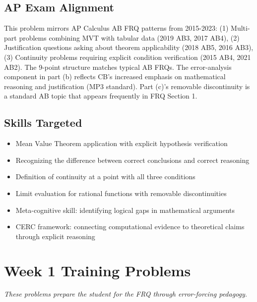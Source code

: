 \documentclass[11pt,letterpaper]{article}
\begin{document}
\subsection*{AP Exam Alignment}
This problem mirrors AP Calculus AB FRQ patterns from 2015-2023: (1) Multi-part problems combining MVT with tabular data (2019 AB3, 2017 AB4), (2) Justification questions asking about theorem applicability (2018 AB5, 2016 AB3), (3) Continuity problems requiring explicit condition verification (2015 AB4, 2021 AB2). The 9-point structure matches typical AB FRQs. The error-analysis component in part (b) reflects CB's increased emphasis on mathematical reasoning and justification (MP3 standard). Part (c)'s removable discontinuity is a standard AB topic that appears frequently in FRQ Section 1.

\subsection*{Skills Targeted}
\begin{itemize}[leftmargin=*]
  \item Mean Value Theorem application with explicit hypothesis verification
  \item Recognizing the difference between correct conclusions and correct reasoning
  \item Definition of continuity at a point with all three conditions
  \item Limit evaluation for rational functions with removable discontinuities
  \item Meta-cognitive skill: identifying logical gaps in mathematical arguments
  \item CERC framework: connecting computational evidence to theoretical claims through explicit reasoning
\end{itemize}

\vspace{0.5cm}


\section*{\textcolor{alphablue}{Week 1 Training Problems}}

\textit{These problems prepare the student for the FRQ through error-forcing pedagogy.}
\end{document}
